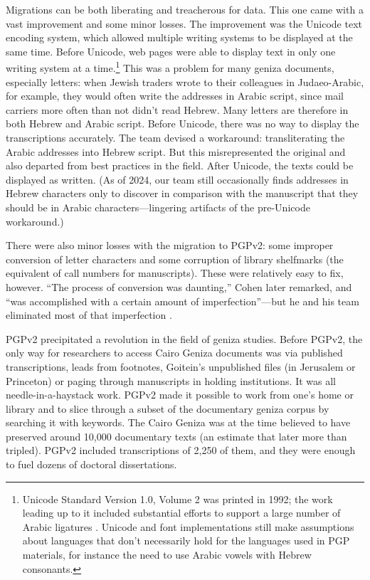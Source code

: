 \documentclass{article}
\begin{document}
Migrations can be both liberating and treacherous for data. This one came with a vast improvement and some minor losses. The improvement was the Unicode text encoding system, which allowed multiple writing systems to be displayed at the same time. Before Unicode, web pages were able to display text in only one writing system at a time.\footnote{Unicode Standard Version 1.0, Volume 2 was printed in 1992; the work leading up to it included substantial efforts to support a large number of Arabic ligatures \autocite{noauthor_chronology_nodate}. Unicode and font implementations still make assumptions about languages that don't necessarily hold for the languages used in PGP materials, for instance the need to use Arabic vowels with Hebrew consonants.} This was a problem for many geniza documents, especially letters: when Jewish traders wrote to their colleagues in Judaeo-Arabic, for example, they would often write the addresses in Arabic script, since mail carriers more often than not didn't read Hebrew. Many letters are therefore in both Hebrew and Arabic script. Before Unicode, there was no way to display the transcriptions accurately. The team devised a workaround: transliterating the Arabic addresses into Hebrew script. But this misrepresented the original and also departed from best practices in the field. After Unicode, the texts could be displayed as written. (As of 2024, our team still occasionally finds addresses in Hebrew characters only to discover in comparison with the manuscript that they should be in Arabic characters—lingering artifacts of the pre-Unicode workaround.) 

There were also minor losses with the migration to PGPv2: some improper conversion of letter characters and some corruption of library shelfmarks (the equivalent of call numbers for manuscripts). These were relatively easy to fix, however. “The process of conversion was daunting,” Cohen later remarked, and “was accomplished with a certain amount of imperfection”—but he and his team eliminated most of that imperfection \autocite[43]{cohen_princeton_2014}.

PGPv2 precipitated a revolution in the field of geniza studies. Before PGPv2, the only way for researchers to access Cairo Geniza documents was via published transcriptions, leads from footnotes, Goitein’s unpublished files (in Jerusalem or Princeton) or paging through manuscripts in holding institutions. It was all needle-in-a-haystack work. PGPv2 made it possible to work from one’s home or library and to slice through a subset of the documentary geniza corpus by searching it with keywords. The Cairo Geniza was at the time believed to have preserved around 10,000 documentary texts (an estimate that later more than tripled). PGPv2 included transcriptions of 2,250 of them, and they were enough to fuel dozens of doctoral dissertations. 
\end{document}
